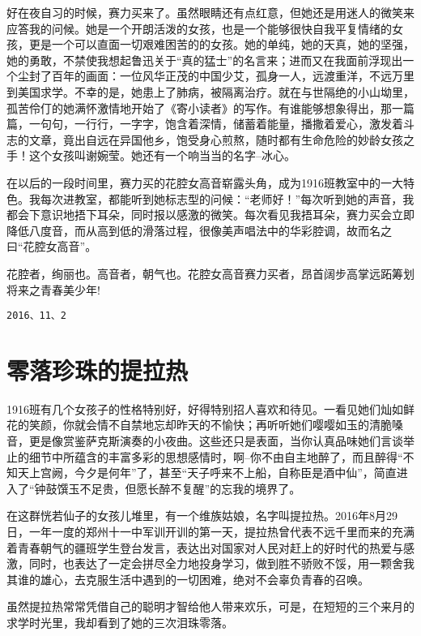 \documentclass[openany]{ctexbook}
\begin{document}
好在夜自习的时候，赛力买来了。虽然眼睛还有点红意，但她还是用迷人的微笑来应答我的问候。她是一个开朗活泼的女孩，也是一个能够很快自我平复情绪的女孩，更是一个可以直面一切艰难困苦的的女孩。她的单纯，她的天真，她的坚强，她的勇敢，不禁使我想起鲁迅关于``真的猛士''的名言来；进而又在我面前浮现出一个尘封了百年的画面：一位风华正茂的中国少艾，孤身一人，远渡重洋，不远万里到美国求学。不幸的是，她患上了肺病，被隔离治疗。就在与世隔绝的小山坳里，孤苦伶仃的她满怀激情地开始了《寄小读者》的写作。有谁能够想象得出，那一篇篇，一句句，一行行，一字字，饱含着深情，储蓄着能量，播撒着爱心，激发着斗志的文章，竟出自远在异国他乡，饱受身心煎熬，随时都有生命危险的妙龄女孩之手！这个女孩叫谢婉莹。她还有一个响当当的名字--冰心。

在以后的一段时间里，赛力买的花腔女高音崭露头角，成为1916班教室中的一大特色。我每次进教室，都能听到她标志型的问候：``老师好！''每次听到她的声音，我都会下意识地捂下耳朵，同时报以感激的微笑。每次看见我捂耳朵，赛力买会立即降低八度音，而从高到低的滑落过程，很像美声唱法中的华彩腔调，故而名之曰``花腔女高音''。

花腔者，绚丽也。高音者，朝气也。花腔女高音赛力买者，昂首阔步高掌远跖筹划将来之青春美少年!

\begin{verbatim}
2016、11、2
\end{verbatim}

\chapter*{零落珍珠的提拉热}\label{tilare}

1916班有几个女孩子的性格特别好，好得特别招人喜欢和待见。一看见她们灿如鲜花的笑颜，你就会情不自禁地忘却昨天的不愉快；再听听她们嘤嘤如玉的清脆嗓音，更是像赏鉴萨克斯演奏的小夜曲。这些还只是表面，当你认真品味她们言谈举止的细节中所蕴含的丰富多彩的思想感情时，啊--你不由自主地醉了，而且醉得``不知天上宫阙，今夕是何年''了，甚至``天子呼来不上船，自称臣是酒中仙''，简直进入了``钟鼓馔玉不足贵，但愿长醉不复醒''的忘我的境界了。

在这群恍若仙子的女孩儿堆里，有一个维族姑娘，名字叫提拉热。2016年8月29日，一年一度的郑州十一中军训开训的第一天，提拉热曾代表不远千里而来的充满着青春朝气的疆班学生登台发言，表达出对国家对人民对赶上的好时代的热爱与感激，同时，也表达了一定会拼尽全力地投身学习，做到胜不骄败不馁，用一颗舍我其谁的雄心，去克服生活中遇到的一切困难，绝对不会辜负青春的召唤。

虽然提拉热常常凭借自己的聪明才智给他人带来欢乐，可是，在短短的三个来月的求学时光里，我却看到了她的三次泪珠零落。
\end{document}
